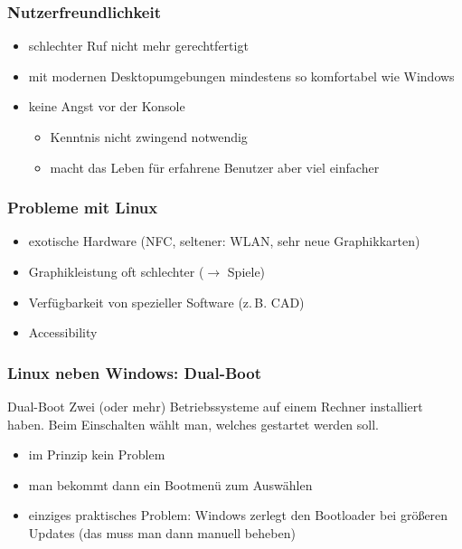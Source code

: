 \documentclass[t]{beamer}
\begin{document}
\begin{frame}
  \frametitle{Nutzerfreundlichkeit}
  \begin{itemize}
  \item schlechter Ruf nicht mehr gerechtfertigt
  \item mit modernen Desktopumgebungen mindestens so komfortabel wie
    Windows
  \item keine Angst vor der Konsole
    \begin{itemize}
    \item Kenntnis nicht zwingend notwendig
    \item macht das Leben für erfahrene Benutzer aber viel einfacher
    \end{itemize}
  \end{itemize}
\end{frame}

\begin{frame}
  \frametitle{Probleme mit Linux}
  \begin{itemize}
  \item exotische Hardware (NFC, seltener: WLAN, sehr neue Graphikkarten)
  \item Graphikleistung oft schlechter ($\rightarrow$ Spiele)
  \item Verfügbarkeit von spezieller Software (z.\,B. CAD)
  \item Accessibility
  \end{itemize}
\end{frame}

\begin{frame}
  \frametitle{Linux neben Windows: Dual-Boot}
  \begin{definition}{Dual-Boot}
    Zwei (oder mehr) Betriebssysteme auf einem Rechner installiert haben. Beim Einschalten wählt man, welches gestartet werden soll.
  \end{definition}
  \begin{itemize}
  \item im Prinzip kein Problem
  \item man bekommt dann ein Bootmenü zum Auswählen
  \item einziges praktisches Problem: Windows zerlegt den Bootloader
    bei größeren Updates (das muss man dann manuell beheben)
  \end{itemize}
\end{frame}
\end{document}
